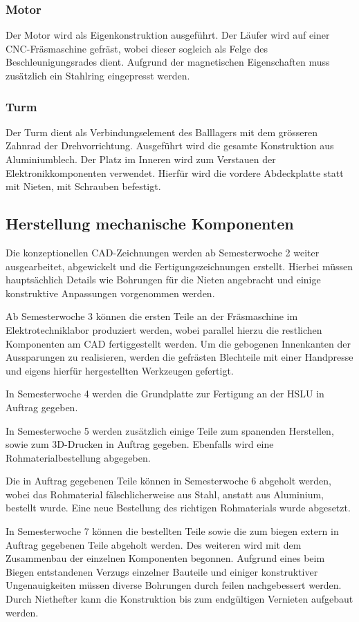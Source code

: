 \subsubsection{Motor}
Der Motor wird als Eigenkonstruktion ausgeführt. Der Läufer wird auf einer CNC-Fräsmaschine gefräst, wobei dieser sogleich als Felge des 
Beschleunigungsrades dient. Aufgrund der magnetischen Eigenschaften muss zusätzlich ein Stahlring eingepresst werden.

\subsubsection{Turm}
Der Turm dient als Verbindungselement des Balllagers mit dem grösseren 
Zahnrad der Drehvorrichtung. Ausgeführt wird die gesamte Konstruktion aus Aluminiumblech. Der Platz im Inneren wird zum Verstauen der 
Elektronikkomponenten verwendet. Hierfür wird die vordere Abdeckplatte statt mit Nieten, mit Schrauben befestigt.

\clearpage
\subsection{Herstellung mechanische Komponenten}
Die konzeptionellen CAD-Zeichnungen werden ab Semesterwoche 2 weiter ausgearbeitet, abgewickelt und die Fertigungszeichnungen erstellt. Hierbei müssen hauptsächlich Details wie Bohrungen für die Nieten angebracht und einige konstruktive Anpassungen vorgenommen werden. 

Ab Semesterwoche 3 können die ersten Teile an der Fräsmaschine im Elektrotechniklabor produziert werden, wobei parallel  hierzu die restlichen Komponenten am CAD fertiggestellt werden.
Um die gebogenen Innenkanten der Aussparungen zu realisieren, werden die gefrästen Blechteile mit einer Handpresse und eigens hierfür hergestellten Werkzeugen gefertigt.

In Semesterwoche 4 werden die Grundplatte zur Fertigung an der HSLU in Auftrag gegeben.

In Semesterwoche 5 werden zusätzlich einige Teile zum spanenden Herstellen, sowie zum 3D-Drucken in Auftrag gegeben. Ebenfalls wird eine Rohmaterialbestellung abgegeben.

Die in Auftrag gegebenen Teile können in Semesterwoche 6 abgeholt werden, wobei das  Rohmaterial fälschlicherweise aus Stahl, anstatt aus Aluminium, bestellt wurde. Eine neue Bestellung des richtigen Rohmaterials wurde abgesetzt.

In Semesterwoche 7 können die bestellten Teile sowie die zum biegen extern in Auftrag gegebenen Teile abgeholt werden. Des weiteren wird mit dem Zusammenbau der einzelnen Komponenten begonnen. Aufgrund eines beim Biegen entstandenen Verzugs einzelner Bauteile und einiger konstruktiver Ungenauigkeiten müssen diverse Bohrungen durch feilen nachgebessert werden. Durch Niethefter kann die Konstruktion bis zum endgültigen Vernieten aufgebaut werden.


